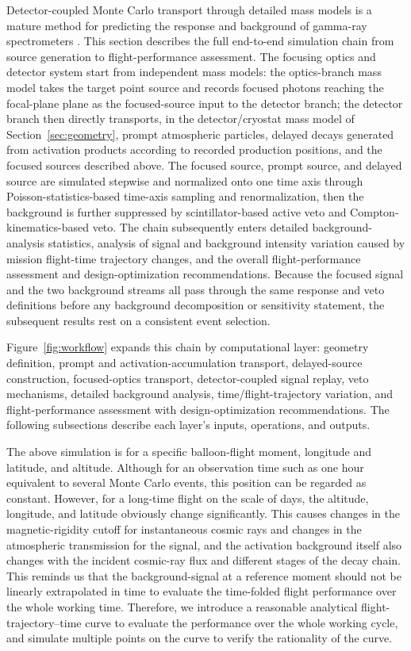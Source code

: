 \documentclass[11pt]{article}
\begin{document}
Detector-coupled Monte Carlo transport through detailed mass models is a mature method for predicting the response and background of gamma-ray spectrometers \cite{Sturner2003}. This section describes the full end-to-end simulation chain from source generation to flight-performance assessment. The focusing optics and detector system start from independent mass models: the optics-branch mass model takes the target point source and records focused photons reaching the focal-plane plane as the focused-source input to the detector branch; the detector branch then directly transports, in the detector/cryostat mass model of Section~\ref{sec:geometry}, prompt atmospheric particles, delayed decays generated from activation products according to recorded production positions, and the focused sources described above. The focused source, prompt source, and delayed source are simulated stepwise and normalized onto one time axis through Poisson-statistics-based time-axis sampling and renormalization, then the background is further suppressed by scintillator-based active veto and Compton-kinematics-based veto. The chain subsequently enters detailed background-analysis statistics, analysis of signal and background intensity variation caused by mission flight-time trajectory changes, and the overall flight-performance assessment and design-optimization recommendations. Because the focused signal and the two background streams all pass through the same response and veto definitions before any background decomposition or sensitivity statement, the subsequent results rest on a consistent event selection.

Figure~\ref{fig:workflow} expands this chain by computational layer: geometry definition, prompt and activation-accumulation transport, delayed-source construction, focused-optics transport, detector-coupled signal replay, veto mechanisms, detailed background analysis, time/flight-trajectory variation, and flight-performance assessment with design-optimization recommendations. The following subsections describe each layer's inputs, operations, and outputs.

The above simulation is for a specific balloon-flight moment, longitude and latitude, and altitude. Although for an observation time such as one hour equivalent to several Monte Carlo events, this position can be regarded as constant. However, for a long-time flight on the scale of days, the altitude, longitude, and latitude obviously change significantly. This causes changes in the magnetic-rigidity cutoff for instantaneous cosmic rays and changes in the atmospheric transmission for the signal, and the activation background itself also changes with the incident cosmic-ray flux and different stages of the decay chain. This reminds us that the background-signal at a reference moment should not be linearly extrapolated in time to evaluate the time-folded flight performance over the whole working time. Therefore, we introduce a reasonable analytical flight-trajectory--time curve to evaluate the performance over the whole working cycle, and simulate multiple points on the curve to verify the rationality of the curve.
\end{document}
